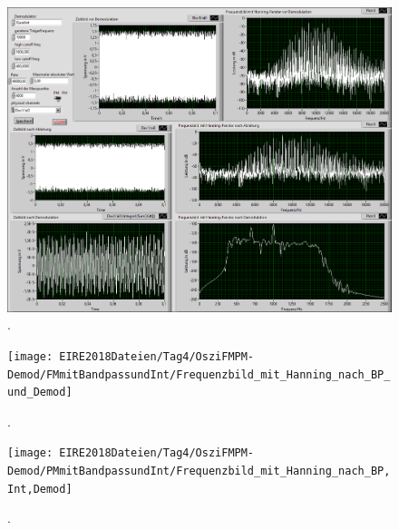 \documentclass[
a4paper,
12pt,
pagesize,
ngerman
]{scrartcl}
\begin{document}
	\begin{figure}[H]
		\centering
		\includegraphics[width=1.0\textwidth]{EIRE2018Dateien/Tag4/OsziFMPM-Demod/mitBandpassUndIntegrationBilder/OsziPlusFMPMp}
		\caption{.}
	\end{figure}
	
	\begin{figure}[H] %
		\centering
		\texttt{[image: EIRE2018Dateien/Tag4/OsziFMPM-Demod/FMmitBandpassundInt/Frequenzbild\_mit\_Hanning\_nach\_BP\_und\_Demod]}
		\caption{.}
	\end{figure}
	
	\begin{figure}[H] %
		\centering
		\texttt{[image: EIRE2018Dateien/Tag4/OsziFMPM-Demod/PMmitBandpassundInt/Frequenzbild\_mit\_Hanning\_nach\_BP,Int,Demod]}
		\caption{.}
	\end{figure}
	
	
	\printbibliography
	
	
\end{document}
